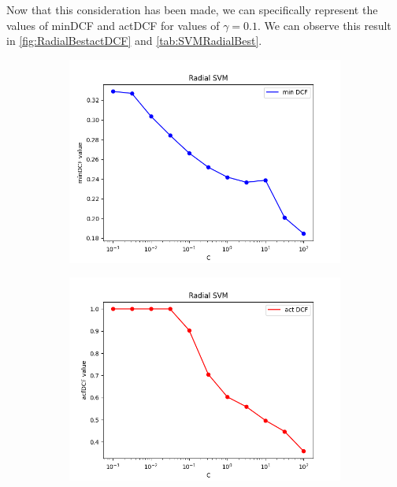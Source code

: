 Now that this consideration has been made, we can specifically represent the values of minDCF and actDCF for values of \(\gamma=0.1\).
We can observe this result in \autoref{fig:RadialBestactDCF} and \autoref{tab:SVMRadialBest}.

\begin{figure}[h!]
    \centering
    \begin{subfigure}[b]{0.30\linewidth}
        \includegraphics[width=\linewidth]{Lab/09. Lab 09/Images/09. Radial Best - minDCF}
        \label{fig:RadialBestminDCF}
    \end{subfigure}
    \begin{subfigure}[b]{0.30\linewidth}
        \includegraphics[width=\linewidth]{Lab/09. Lab 09/Images/10. Radial Best - actDCF}

\end{subfigure}
\end{figure}
